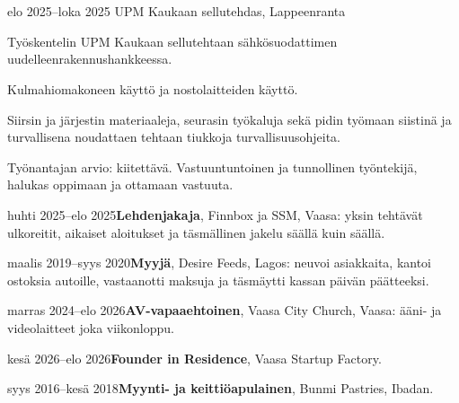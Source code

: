 \documentclass[a4paper,11pt]{article}
\begin{document}
\section{}
\begin{cventry}{elo 2025--loka 2025}{}
  UPM Kaukaan sellutehdas, Lappeenranta\par
  Työskentelin UPM Kaukaan sellutehtaan sähkösuodattimen uudelleenrakennushankkeessa.\par
  Kulmahiomakoneen käyttö ja nostolaitteiden käyttö.\par
  Siirsin ja järjestin materiaaleja, seurasin työkaluja sekä pidin työmaan siistinä ja turvallisena noudattaen tehtaan tiukkoja turvallisuusohjeita.\par
  Työnantajan arvio: kiitettävä. Vastuuntuntoinen ja tunnollinen työntekijä, halukas oppimaan ja ottamaan vastuuta.
\end{cventry}
\begin{cventry}{huhti 2025--elo 2025}{\textbf{Lehdenjakaja}, Finnbox ja SSM, Vaasa: yksin tehtävät ulkoreitit, aikaiset aloitukset ja täsmällinen jakelu säällä kuin säällä.}
\end{cventry}
\begin{cventry}{maalis 2019--syys 2020}{\textbf{Myyjä}, Desire Feeds, Lagos: neuvoi asiakkaita, kantoi ostoksia autoille, vastaanotti maksuja ja täsmäytti kassan päivän päätteeksi.}
\end{cventry}
\begin{cventry}{marras 2024--elo 2026}{\textbf{AV-vapaaehtoinen}, Vaasa City Church, Vaasa: ääni- ja videolaitteet joka viikonloppu.}
\end{cventry}
\begin{cventry}{kesä 2026--elo 2026}{\textbf{Founder in Residence}, Vaasa Startup Factory.}
\end{cventry}
\begin{cventry}{syys 2016--kesä 2018}{\textbf{Myynti- ja keittiöapulainen}, Bunmi Pastries, Ibadan.}
\end{cventry}

\section{}

\section{}
\end{document}
